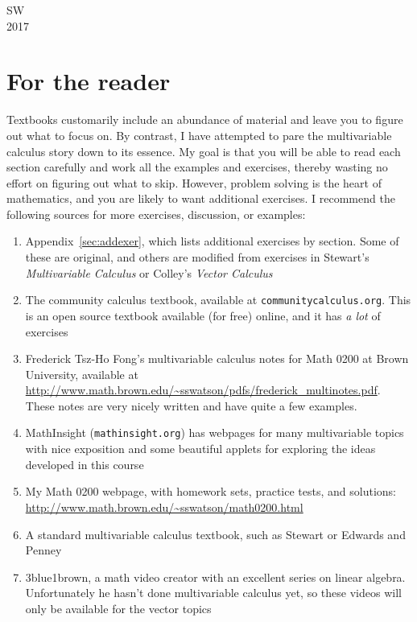 \documentclass[svgnames]{watsonbook}
\begin{document}
SW \\
2017

\chapter*{For the reader}

Textbooks customarily include an abundance of material and leave you
to figure out what to focus on. By contrast, I have attempted to pare
the multivariable calculus story down to its essence. My goal is that
you will be able to read each section carefully and work all the
examples and exercises, thereby wasting no effort on figuring out what
to skip. However, problem solving is the heart of mathematics, and you
are likely to want additional exercises. I recommend the following
sources for more exercises, discussion, or examples: 
\begin{enumerate}[itemsep = 3pt]
\item Appendix~\ref{sec:addexer}, which lists additional exercises by
  section. Some of these are original, and others are
  modified from exercises in 
  Stewart's \textit{Multivariable Calculus} or Colley's \textit{Vector
    Calculus} 
\item The community calculus textbook, available at
  \texttt{communitycalculus.org}. This is an open source textbook available (for
  free) online, and it has \textit{a lot} of exercises 
\item Frederick Tsz-Ho Fong's multivariable calculus notes for Math 0200 at
  Brown University, available at
  \href{http://www.math.brown.edu/~sswatson/pdfs/frederick_multinotes.pdf}{\url{http://www.math.brown.edu/~sswatson/pdfs/frederick\_multinotes.pdf}}. These
  notes are very nicely written and have quite a few examples. 
\item MathInsight (\texttt{mathinsight.org}) has webpages for many
  multivariable topics with nice exposition and some beautiful applets for exploring the
  ideas developed in this course
\item My Math 0200 webpage, with homework sets, practice tests, and
  solutions: \\
  \href{http://www.math.brown.edu/~sswatson/math0200.html}{\url{http://www.math.brown.edu/~sswatson/math0200.html}}
\item A standard multivariable calculus textbook, such as Stewart
  or Edwards and Penney
\item 3blue1brown, a math video creator with an excellent series on
  linear algebra. Unfortunately he hasn't done multivariable calculus
  yet, so these videos will only be available for the vector topics
 \end{enumerate}
\end{document}
